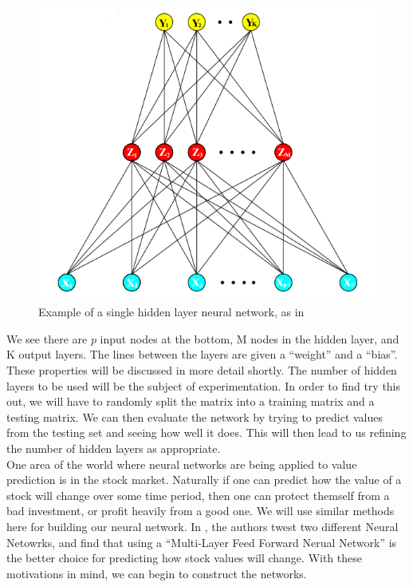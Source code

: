 \begin{figure}
    \centering
    \includegraphics[scale=0.5]{figures/nn.png}
    \caption{Example of a single hidden layer neural network, as in \cite{sprbk}}
    \label{nnexample1}
\end{figure}

We see there are $p$ input nodes at the bottom, M nodes in the hidden layer, and K output layers. The lines between the layers are given a ``weight''
and a ``bias''. These properties will be discussed in more detail shortly. The number of hidden layers to be used will be the subject of experimentation. In order to find try this out, we will have to randomly
split the matrix into a training matrix and a testing matrix. We can then evaluate the network by trying to predict values from the testing set and seeing
how well it does. This will then lead to us refining the number of hidden layers as appropriate. \\

One area of the world where neural networks are being applied to value prediction is in the stock market. Naturally if one can predict how the value of a stock
will change over some time period, then one can protect themself from a bad investment, or profit heavily from a good one. We will use similar
methods here for building our neural network.  In \cite{nnstock}, the authors twest two different Neural Netowrks, and find that using a ``Multi-Layer Feed Forward Nerual Network''
is the better choice for predicting how stock values will change. With these motivations in mind, we can begin to construct the networks.

